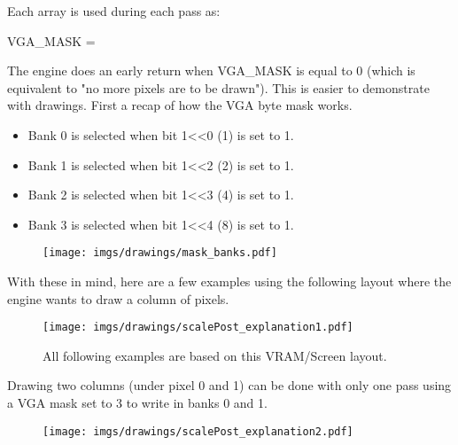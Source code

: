  \par
 \begin{minipage}{\textwidth}

\end{minipage}
\par
Each  array is used during each pass  as:\\
\par
 VGA\_MASK = \\
 \par
 The engine does an early return when VGA\_MASK is equal to 0 (which is equivalent to "no more pixels are to be drawn"). This is easier to demonstrate with drawings. First a recap of how the VGA byte mask works.
\begin{itemize}
\item Bank 0 is selected when bit 1<<0 (1) is set to 1.
\item Bank 1 is selected when bit 1<<2 (2) is set to 1.
\item Bank 2 is selected when bit 1<<3 (4) is set to 1.
\item Bank 3 is selected when bit 1<<4 (8) is set to 1.
\end{itemize}
\par


\begin{figure}[H]
\centering
 \texttt{[image: imgs/drawings/mask\_banks.pdf]}
 \end{figure}


With these in mind, here are a few examples using the following layout where the engine wants to draw a column of pixels.
\begin{figure}[H]
\centering
 \texttt{[image: imgs/drawings/scalePost\_explanation1.pdf]}
 \caption{All following examples are based on this VRAM/Screen layout.}
 \end{figure}


 Drawing two columns (under pixel 0 and 1) can be done with only one pass using a VGA mask set to 3 to write in banks 0 and 1.\\
 \par
 \begin{minipage}{\textwidth}

\end{minipage}
\par

 \begin{figure}[H]
 \centering
 \texttt{[image: imgs/drawings/scalePost\_explanation2.pdf]}
 \end{figure}




